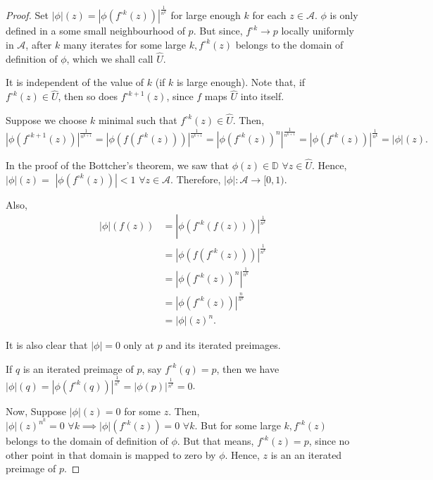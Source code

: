 \begin{proof}
Set $|\phi|(z)=\left|\phi\left(f^{\circ k}(z)\right)\right|^{\frac{1}{n^{k}}}$ for large enough $k$ for each $z \in \mathcal{A}$. $\phi$ is only defined in a some small neighbourhood of $p$. But since, $f^{\circ k} \rightarrow p$ locally uniformly in $\mathcal{A}$, after $k$ many iterates for some large $k, f^{\circ k}(z)$ belongs to the domain of definition of $\phi$, which we shall call $\hat{U}$.

It is independent of the value of $k$ (if $k$ is large enough). Note that, if $f^{\circ k}(z) \in \hat{U}$, then so does $f^{\circ k+1}(z)$, since $f$ maps $\hat{U}$ into itself.

Suppose we choose $k$ minimal such that $f^{\circ k}(z) \in \hat{U}$. Then,
$$
\left|\phi\left(f^{\circ k+1}(z)\right)\right|^{\frac{1}{n^{k+1}}}=\left|\phi\left(f\left(f^{\circ k}(z)\right)\right)\right|^{\frac{1}{n^{k+1}}}=\left|\phi\left(f^{\circ k}(z)\right)^{n}\right|^{\frac{1}{n^{k+1}}}=\left|\phi\left(f^{\circ k}(z)\right)\right|^{\frac{1}{n^{k}}}=|\phi|(z) .
$$

In the proof of the Bottcher's theorem, we saw that $\phi(z) \in \mathbb{D}\,\, \forall z \in \hat{U}$. Hence, $|\phi|(z)=$ $\left|\phi\left(f^{\circ k}(z)\right)\right|<1\,\, \forall z \in \mathcal{A}$. Therefore, $|\phi|: \mathcal{A} \rightarrow[0,1)$.

Also,
$$
\begin{aligned}
|\phi|(f(z)) & =\left| \phi\left(\left.f^{\circ k}(f(z))\right)\right|^{\frac{1}{n^{k}}}\right. \\
& =\left|\phi\left(f\left(f^{\circ k}(z)\right)\right)\right|^{\frac{1}{n^{k}}} \\
& =\left|\phi\left(f^{\circ k}(z)\right)^{n}\right|^{\frac{1}{n^{k}}} \\
& =\left|\phi\left(f^{\circ k}(z)\right)\right|^{\frac{n}{n^{k}}} \\
& =|\phi|(z)^{n} .
\end{aligned}
$$

It is also clear that $|\phi|=0$ only at $p$ and its iterated preimages.

If $q$ is an iterated preimage of $p$, say $f^{\circ k}(q)=p$, then we have $|\phi|(q)=\left|\phi\left(f^{\circ k}(q)\right)\right|^{\frac{1}{n^{k}}}=|\phi(p)|^{\frac{1}{n^{k}}}=0$.

Now, Suppose $|\phi|(z)=0$ for some $z$. Then, $|\phi|(z)^{n^{k}}=0 \,\,\forall k \implies|\phi|\left(f^{\circ k}(z)\right)=0 \,\,\forall k$. But for some large $k, f^{\circ k}(z)$ belongs to the domain of definition of $\phi$. But that means, $f^{\circ k}(z)=p$, since no other point in that domain is mapped to zero by $\phi$. Hence, $z$ is an an iterated preimage of $p$.


\end{proof}
